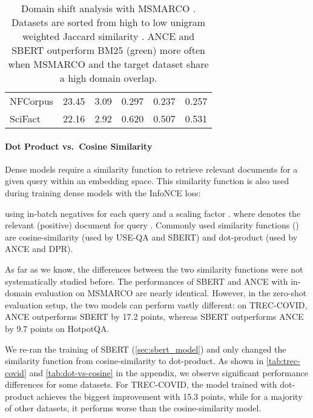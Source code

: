 \documentclass[11pt]{article}
\begin{document}
\begin{table}[t!]
{\begin{tabular}{l  c  c  c  c  c}
NFCorpus      & 23.45 & 3.09 & 0.297  & \colorbox{red!30}{0.237}   & \colorbox{red!30}{0.257} \\
SciFact       & 22.16 & 2.92 & 0.620  & \colorbox{red!30}{0.507}   & \colorbox{red!30}{0.531} \\ \bottomrule
     \end{tabular}
    }
    \centering
    \caption{Domain shift analysis with MSMARCO \cite{nguyen2016ms}. Datasets are sorted from high to low unigram weighted Jaccard similarity \cite{ioffe2010improved}. ANCE and SBERT outperform BM25 (green) more often when MSMARCO and the target dataset share a high domain overlap.} 
    \label{tab:domain-shift}
    \vspace*{-\baselineskip}
\end{table}

\paragraph{Dot Product vs.\ Cosine Similarity} Dense models require a similarity function to retrieve relevant documents for a given query within an embedding space. This similarity function is also used during training dense models with the InfoNCE \cite{oord2019representation} loss:

using  in-batch negatives for each query  and a scaling factor . where  denotes the relevant (positive) document for query . Commonly used similarity functions () are cosine-similarity (used by USE-QA and SBERT) and dot-product (used by ANCE and DPR). 

As far as we know, the differences between the two similarity functions were not systematically studied before. The performances of SBERT and ANCE with in-domain evaluation on MSMARCO are nearly identical. However, in the zero-shot evaluation setup, the two models can perform vastly different: on TREC-COVID, ANCE outperforms SBERT by 17.2 points, whereas SBERT outperforms ANCE by 9.7 points on HotpotQA.

We re-ran the training of SBERT (\autoref{sec:sbert_model}) and only changed the similarity function from cosine-similarity to dot-product. As shown in \autoref{tab:trec-covid} and \autoref{tab:dot-vs-cosine} in the appendix, we observe significant performance differences for some datasets. For TREC-COVID, the model trained with dot-product achieves the biggest improvement with 15.3 points, while for a majority of other datasets, it performs worse than the cosine-similarity model.
\end{document}

